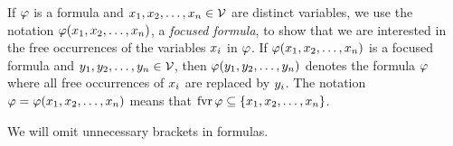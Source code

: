 
If $\varphi$ is a formula and $x_{1}, x_{2}, \dots, x_{n} \in \mathcal{V}$ are
distinct variables, we use the notation $\varphi(x_{1}, x_{2}, \dots,
x_{n})$, a \emph{focused formula}, to
show that we are interested in the free occurrences of the variables $x_{i}$
in $\varphi$. If $\varphi(x_{1}, x_{2}, \dots, x_{n})$ is a focused formula and
$y_{1}, y_{2}, \dots, y_{n} \in \mathcal{V}$, then
$\varphi(y_{1}, y_{2}, \dots, y_{n})$ denotes the formula $\varphi$ where all
free occurrences of $x_{i}$ are replaced by $y_{i}$.
The notation $\varphi = \varphi(x_{1}, x_{2}, \dots, x_{n})$ means that 
$\operatorname{fvr}\varphi \subseteq \left\{x_{1}, x_{2}, \dots, x_{n}\right\}$.

We will omit unnecessary brackets in formulas.